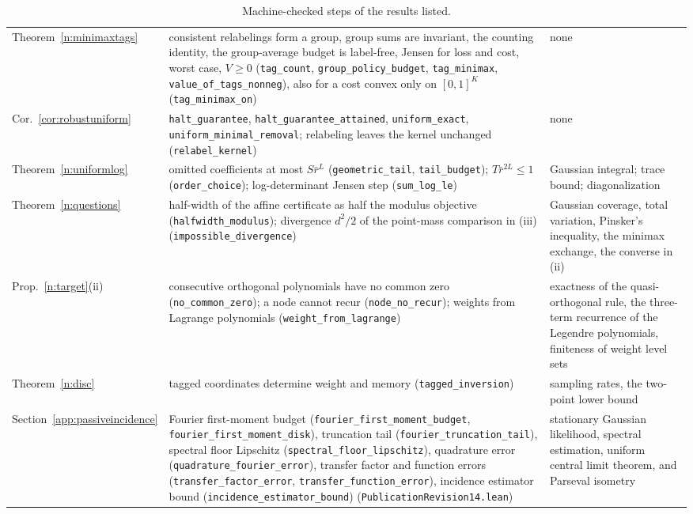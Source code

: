 \documentclass[12pt]{article}
\theoremstyle{definition}
\theoremstyle{remark}
\begin{document}
\begin{table}[ht]
\begin{tabular}{>{\raggedright\arraybackslash}p{}>{\raggedright\arraybackslash}p{}>{\raggedright\arraybackslash}p{}}
Theorem~\ref{n:minimaxtags} & consistent relabelings form a group, group sums are invariant, the counting identity, the group-average budget is label-free, Jensen for loss and cost, worst case, $V\ge0$ (\texttt{tag\_count}, \texttt{group\_policy\_budget}, \texttt{tag\_minimax}, \texttt{value\_of\_tags\_nonneg}), also for a cost convex only on $[0,1]^K$ (\nolinkurl{tag_minimax_on}) & none\\
Cor.~\ref{cor:robustuniform} & \texttt{halt\_guarantee}, \texttt{halt\_guarantee\_attained}, \texttt{uniform\_exact}, \texttt{uniform\_minimal\_removal}; relabeling leaves the kernel unchanged (\texttt{relabel\_kernel}) & none\\
Theorem~\ref{n:uniformlog} & omitted coefficients at most $S\bar r^{L}$ (\texttt{geometric\_tail}, \texttt{tail\_budget}); $T\bar r^{2L}\le1$ (\texttt{order\_choice}); log-determinant Jensen step (\texttt{sum\_log\_le}) & Gaussian integral; trace bound; diagonalization\\Theorem~\ref{n:questions} & half-width of the affine certificate as half the modulus objective (\nolinkurl{halfwidth_modulus}); divergence $d^2/2$ of the point-mass comparison in (iii) (\nolinkurl{impossible_divergence}) & Gaussian coverage, total variation, Pinsker's inequality, the minimax exchange, the converse in (ii)\\
Prop.~\ref{n:target}(ii) & consecutive orthogonal polynomials have no common zero (\nolinkurl{no_common_zero}); a node cannot recur (\nolinkurl{node_no_recur}); weights from Lagrange polynomials (\nolinkurl{weight_from_lagrange}) & exactness of the quasi-orthogonal rule, the three-term recurrence of the Legendre polynomials, finiteness of weight level sets\\
Theorem~\ref{n:disc} & tagged coordinates determine weight and memory (\nolinkurl{tagged_inversion}) & sampling rates, the two-point lower bound\\
Section~\ref{app:passiveincidence} & Fourier first-moment budget (\texttt{fourier\_first\_moment\_budget}, \texttt{fourier\_first\_moment\_disk}), truncation tail (\texttt{fourier\_truncation\_tail}), spectral floor Lipschitz (\texttt{spectral\_floor\_lipschitz}), quadrature error (\texttt{quadrature\_fourier\_error}), transfer factor and function errors (\texttt{transfer\_factor\_error}, \texttt{transfer\_function\_error}), incidence estimator bound (\texttt{incidence\_estimator\_bound}) (\nolinkurl{PublicationRevision14.lean}) & stationary Gaussian likelihood, spectral estimation, uniform central limit theorem, and Parseval isometry\\
\bottomrule
\end{tabular}
\caption{Machine-checked steps of the results listed.}\label{tab:newlean}
\end{table}
\end{document}
